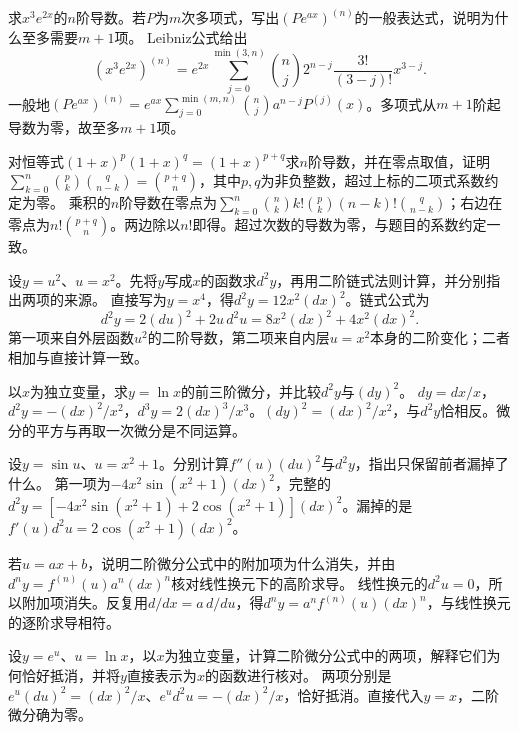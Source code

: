 求\(x^3e^{2x}\)的\(n\)阶导数。若\(P\)为\(m\)次多项式，写出\((Pe^{ax})^{(n)}\)的一般表达式，说明为什么至多需要\(m+1\)项。
\solutionanswer
Leibniz公式给出
\[
 (x^3e^{2x})^{(n)}=e^{2x}\sum_{j=0}^{\min(3,n)}\binom nj2^{n-j}\frac{3!}{(3-j)!}x^{3-j}.
\]
一般地\((Pe^{ax})^{(n)}=e^{ax}\sum_{j=0}^{\min(m,n)}\binom nj a^{n-j}P^{(j)}(x)\)。多项式从\(m+1\)阶起导数为零，故至多\(m+1\)项。


对恒等式\((1+x)^p(1+x)^q=(1+x)^{p+q}\)求\(n\)阶导数，并在零点取值，证明\(\sum_{k=0}^n\binom pk\binom q{n-k}=\binom{p+q}n\)，其中\(p,q\)为非负整数，超过上标的二项式系数约定为零。
\solutionanswer
乘积的\(n\)阶导数在零点为\(\sum_{k=0}^n\binom nk k!\binom pk(n-k)!\binom q{n-k}\)；右边在零点为\(n!\binom{p+q}n\)。两边除以\(n!\)即得。超过次数的导数为零，与题目的系数约定一致。


设\(y=u^2\)、\(u=x^2\)。先将\(y\)写成\(x\)的函数求\(d^2y\)，再用二阶链式法则计算，并分别指出两项的来源。
\solutionanswer
直接写为\(y=x^4\)，得\(d^2y=12x^2(dx)^2\)。链式公式为
\[
 d^2y=2(du)^2+2u\,d^2u
 =8x^2(dx)^2+4x^2(dx)^2.
\]
第一项来自外层函数\(u^2\)的二阶导数，第二项来自内层\(u=x^2\)本身的二阶变化；二者相加与直接计算一致。


以\(x\)为独立变量，求\(y=\ln x\)的前三阶微分，并比较\(d^2y\)与\((dy)^2\)。
\solutionanswer
\(dy=dx/x\)，\(d^2y=-(dx)^2/x^2\)，\(d^3y=2(dx)^3/x^3\)。\((dy)^2=(dx)^2/x^2\)，与\(d^2y\)恰相反。微分的平方与再取一次微分是不同运算。


设\(y=\sin u\)、\(u=x^2+1\)。分别计算\(f''(u)(du)^2\)与\(d^2y\)，指出只保留前者漏掉了什么。
\solutionanswer
第一项为\(-4x^2\sin(x^2+1)(dx)^2\)，完整的\(d^2y=[-4x^2\sin(x^2+1)+2\cos(x^2+1)](dx)^2\)。漏掉的是\(f'(u)d^2u=2\cos(x^2+1)(dx)^2\)。


若\(u=ax+b\)，说明二阶微分公式中的附加项为什么消失，并由\(d^ny=f^{(n)}(u)a^n(dx)^n\)核对线性换元下的高阶求导。
\solutionanswer
线性换元的\(d^2u=0\)，所以附加项消失。反复用\(d/dx=a\,d/du\)，得\(d^ny=a^nf^{(n)}(u)(dx)^n\)，与线性换元的逐阶求导相符。


设\(y=e^u\)、\(u=\ln x\)，以\(x\)为独立变量，计算二阶微分公式中的两项，解释它们为何恰好抵消，并将\(y\)直接表示为\(x\)的函数进行核对。
\solutionanswer
两项分别是\(e^u(du)^2=(dx)^2/x\)、\(e^u d^2u=-(dx)^2/x\)，恰好抵消。直接代入\(y=x\)，二阶微分确为零。


